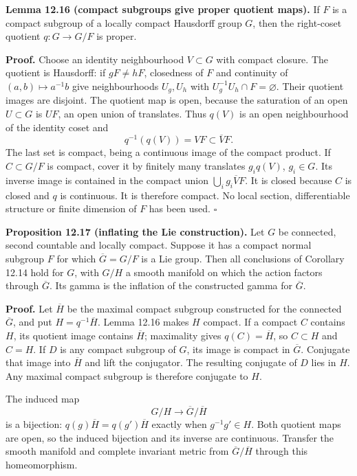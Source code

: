 \documentclass[
  11pt,
]{article}
\begin{document}
\textbf{Lemma 12.16 (compact subgroups give proper quotient maps).} If
\(F\) is a compact subgroup of a locally compact Hausdorff group \(G\),
then the right-coset quotient \(q:G\to G/F\) is proper.

\textbf{Proof.} Choose an identity neighbourhood \(V\subset G\) with
compact closure. The quotient is Hausdorff: if \(gF\ne hF\), closedness
of \(F\) and continuity of \((a,b)\mapsto a^{-1}b\) give neighbourhoods
\(U_g,U_h\) with \(U_g^{-1}U_h\cap F=\varnothing\). Their quotient
images are disjoint. The quotient map is open, because the saturation of
an open \(U\subset G\) is \(UF\), an open union of translates. Thus
\(q(V)\) is an open neighbourhood of the identity coset and \[
q^{-1}(q(V))=VF\subset\overline V F.
\tag{12.51}
\] The last set is compact, being a continuous image of the compact
product. If \(C\subset G/F\) is compact, cover it by finitely many
translates \(g_i q(V)\), \(g_i\in G\). Its inverse image is contained in
the compact union \(\bigcup_i g_i\overline V F\). It is closed because
\(C\) is closed and \(q\) is continuous. It is therefore compact. No
local section, differentiable structure or finite dimension of \(F\) has
been used. \(\square\)

\textbf{Proposition 12.17 (inflating the Lie construction).} Let \(G\)
be connected, second countable and locally compact. Suppose it has a
compact normal subgroup \(F\) for which \(\overline G=G/F\) is a Lie
group. Then all conclusions of Corollary 12.14 hold for \(G\), with
\(G/H\) a smooth manifold on which the action factors through
\(\overline G\). Its gamma is the inflation of the constructed gamma for
\(\overline G\).

\textbf{Proof.} Let \(\overline H\) be the maximal compact subgroup
constructed for the connected \(\overline G\), and put
\(H=q^{-1}\overline H\). Lemma 12.16 makes \(H\) compact. If a compact
\(C\) contains \(H\), its quotient image contains \(\overline H\);
maximality gives \(q(C)=\overline H\), so \(C\subset H\) and \(C=H\). If
\(D\) is any compact subgroup of \(G\), its image is compact in
\(\overline G\). Conjugate that image into \(\overline H\) and lift the
conjugator. The resulting conjugate of \(D\) lies in \(H\). Any maximal
compact subgroup is therefore conjugate to \(H\).

The induced map \[
G/H\longrightarrow\overline G/\overline H
\tag{12.52}
\] is a bijection: \(q(g)\overline H=q(g')\overline H\) exactly when
\(g^{-1}g'\in H\). Both quotient maps are open, so the induced bijection
and its inverse are continuous. Transfer the smooth manifold and
complete invariant metric from \(\overline G/\overline H\) through this
homeomorphism.
\end{document}
